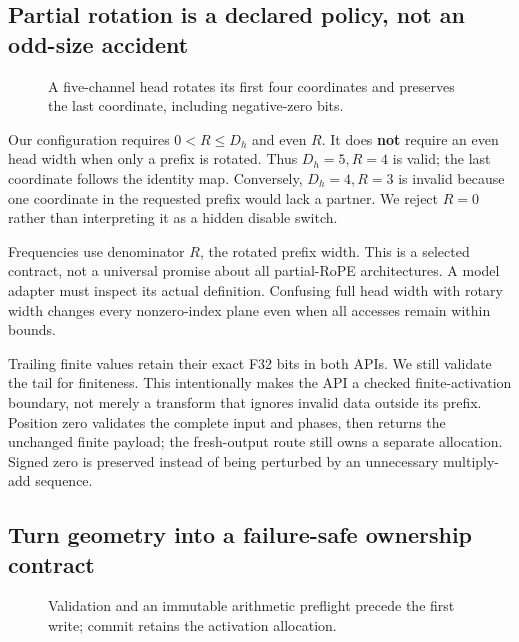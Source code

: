 \documentclass[
  10pt,
]{article}
\begin{document}
\subsection{Partial rotation is a declared policy, not an odd-size
accident}\label{partial-rotation-is-a-declared-policy-not-an-odd-size-accident}

\begin{figure}[H]\centering\resizebox{\linewidth}{!}{}\caption{A five-channel head rotates its first four coordinates and preserves the last coordinate, including negative-zero bits.}\end{figure}

Our configuration requires \(0<R\le D_h\) and even \(R\). It does
\textbf{not} require an even head width when only a prefix is rotated.
Thus \(D_h=5,R=4\) is valid; the last coordinate follows the identity
map. Conversely, \(D_h=4,R=3\) is invalid because one coordinate in the
requested prefix would lack a partner. We reject \(R=0\) rather than
interpreting it as a hidden disable switch.

Frequencies use denominator \(R\), the rotated prefix width. This is a
selected contract, not a universal promise about all partial-RoPE
architectures. A model adapter must inspect its actual definition.
Confusing full head width with rotary width changes every nonzero-index
plane even when all accesses remain within bounds.

Trailing finite values retain their exact F32 bits in both APIs. We
still validate the tail for finiteness. This intentionally makes the API
a checked finite-activation boundary, not merely a transform that
ignores invalid data outside its prefix. Position zero validates the
complete input and phases, then returns the unchanged finite payload;
the fresh-output route still owns a separate allocation. Signed zero is
preserved instead of being perturbed by an unnecessary multiply-add
sequence.

\subsection{Turn geometry into a failure-safe ownership
contract}\label{turn-geometry-into-a-failure-safe-ownership-contract}

\begin{figure}[H]\centering\resizebox{\linewidth}{!}{}\caption{Validation and an immutable arithmetic preflight precede the first write; commit retains the activation allocation.}\end{figure}
\end{document}
